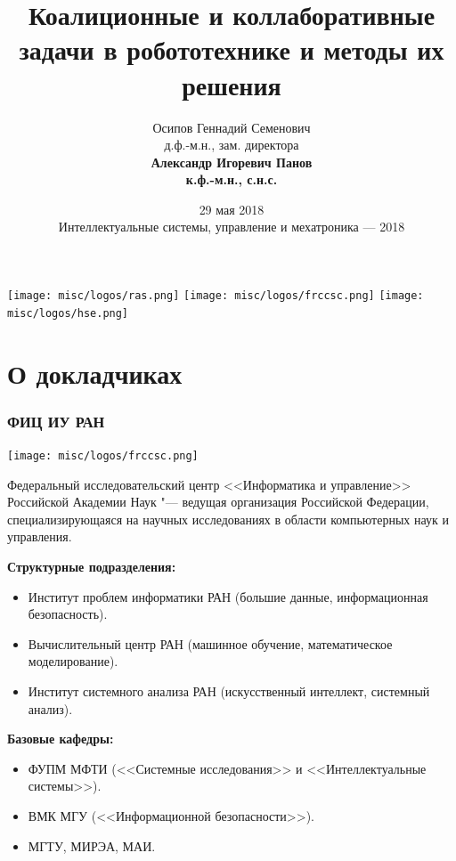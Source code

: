 \documentclass[default]{beamer}
\begin{document}
	
	\title[Коалицинные задачи]{Коалиционные и коллаборативные задачи в робототехнике и методы их решения}
	\author[Панов]{Осипов Геннадий Семенович\\д.ф.-м.н., зам. директора\\
		\textbf{Александр Игоревич Панов}\\\textbf{к.ф.-м.н., с.н.с.}}
	\date[29 мая "--- ИСУМ-2018]{29 мая 2018\\Интеллектуальные системы, управление и мехатроника — 2018} 
	
	\begin{frame}
		\titlepage
		\centering
		\texttt{[image: misc/logos/ras.png]} \hspace{10pt}
		\texttt{[image: misc/logos/frccsc.png]} \hspace{10pt}
		\texttt{[image: misc/logos/hse.png]}
	\end{frame}

	\begin{frame}
		\tableofcontents
	\end{frame}

	\section{О докладчиках}

	\begin{frame}
		\frametitle{ФИЦ ИУ РАН}
		\begin{center}
			\texttt{[image: misc/logos/frccsc.png]}
		\end{center}
		
		\par\bigskip
		\scriptsize
		Федеральный исследовательский центр <<Информатика и управление>> Российской Академии Наук "--- ведущая организация Российской Федерации, специализирующаяся на научных исследованиях в области компьютерных наук и управления.
		
		\textbf{Структурные подразделения:}
		\begin{itemize}
			\item Институт проблем информатики РАН (большие данные, информационная безопасность).
			\item Вычислительный центр РАН (машинное обучение, математическое моделирование).
			\item Институт системного анализа РАН (искусственный интеллект, системный анализ).
		\end{itemize}
		
		\textbf{Базовые кафедры:}
		\begin{itemize}
			\item ФУПМ МФТИ (<<Системные исследования>> и <<Интеллектуальные системы>>).
			\item ВМК МГУ (<<Информационной безопасности>>).
			\item МГТУ, МИРЭА, МАИ.
		\end{itemize}
	\end{frame}
		
\end{document}
